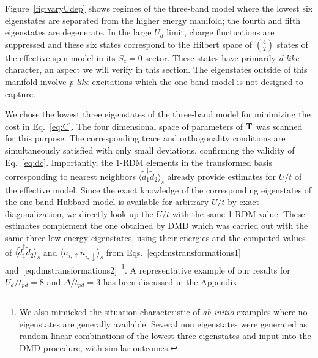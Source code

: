 Figure~\ref{fig:varyUdep} shows regimes of the three-band model where 
the lowest six eigenstates are separated from the higher energy manifold; the 
fourth and fifth eigenstates are degenerate. 
In the large $U_d$ limit, charge fluctuations are suppressed and these six 
states correspond to the Hilbert space of $4 \choose 2$ states of the effective spin model in its $S_z=0$ sector.
These states have primarily \textit{d-like} character, an aspect we will verify in this section. 
The eigenstates outside of this manifold involve \textit{p-like} excitations which the one-band model is not designed 
to capture. 

We chose the lowest three eigenstates of the three-band model for minimizing 
the cost in Eq.~\eqref{eq:C}. The four dimensional space of parameters of ${\bf T}$ 
was scanned for this purpose. The corresponding trace and orthogonality conditions are simultaneously 
satisfied with only small deviations, confirming the validity of Eq.~\eqref{eq:dc}. 
Importantly, the 1-RDM elements in the transformed basis corresponding to nearest neighbors $\langle \tilde{d}_1^{\dagger} \tilde{d}_2 \rangle_s$ 
already provide estimates for $U/t$ of the effective model. Since the exact knowledge of the corresponding eigenstates of 
the one-band Hubbard model is available for arbitrary $U/t$ by exact diagonalization, we directly look up the $U/t$ with 
the same 1-RDM value. These estimates complement the one obtained by DMD which was carried out 
with the same three low-energy eigenstates, using their energies and 
the computed values of $\langle \tilde{d}_1^{\dagger} \tilde{d}_2 \rangle_s$ 
and $\langle \tilde{n}_{i,\uparrow} \tilde{n}_{i,\downarrow} \rangle_{s}$ from Eqs.~\eqref{eq:dmstransformations1} 
and~\eqref{eq:dmstransformations2}~\footnote{We also mimicked the situation characteristic of \textit{ab initio} 
examples where no eigenstates are generally available. Several non eigenstates were generated as random linear combinations of 
the lowest three eigenstates and input into the DMD procedure, with 
similar outcomes.}. A representative example of our results for $U_{d}/t_{pd}=8$ and $\Delta/t_{pd}=3$ 
has been discussed in the Appendix. 

